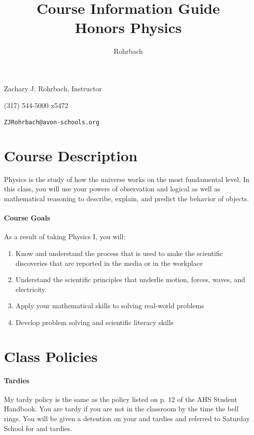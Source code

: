 \documentclass[10pt]{exam}
\title{Course Information Guide \\ Honors Physics}
\author{Rohrbach}
\newcommand{\phonenumber}{(317) 544-5000 x5472}
\begin{document}
\maketitle

\noindent Zachary J. Rohrbach, Instructor

\noindent \phonenumber

\noindent \texttt{ZJRohrbach@avon-schools.org}

\section*{Course Description}

Physics is the study of how the universe works on the most fundamental level.  In this 
class, you will use your powers of observation and logical as well as mathematical 
reasoning to describe, explain, and predict the behavior of objects.

\paragraph{Course Goals} 
As a result of taking Physics I, you will:

\begin{enumerate}
	\item Know and understand the process that is used to make the scientific discoveries that 
				are reported in the media or in the workplace
	\item Understand the scientific principles that underlie motion, forces, waves, and electricity.
	\item Apply your mathematical skills to solving real-world problems
	\item Develop problem solving and scientific literacy skills
\end{enumerate}

\section*{Class Policies}

	\paragraph{Tardies}
		My tardy policy is the same as the policy listed on p. 12  of the AHS Student Handbook.  You are tardy if you are not in the classroom by the time the bell rings.  You will be given a detention on your  and  tardies and referred to Saturday School for  and  tardies.
	
\end{document}
